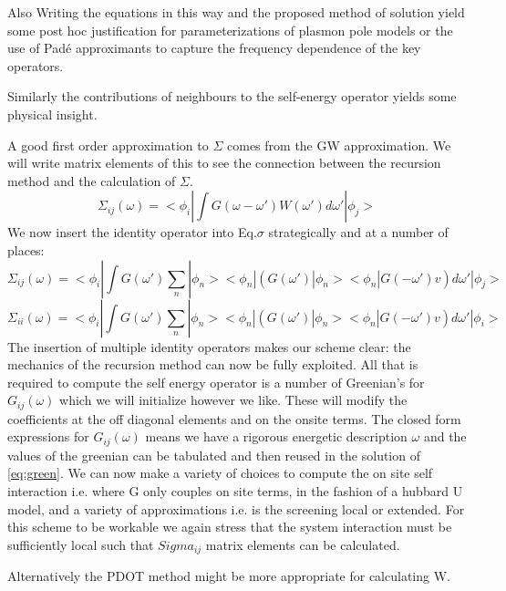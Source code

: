 \documentclass{article}
\begin{document}
Also Writing the equations in this way and the proposed method of solution
yield some post hoc justification for parameterizations of plasmon
pole models or the use of Pad\'e approximants to capture the frequency dependence
of the key operators.

Similarly the contributions of neighbours to the self-energy 
operator yields some physical insight.

A good first order approximation to $\Sigma$ comes from the GW approximation.
We will write matrix elements of this to see the connection between the
recursion method and the calculation of $\Sigma$. 
%
\begin{equation}
\label{eq:sigma}
\Sigma_{ij}(\omega) = <\phi_{i}|\int G(\omega-\omega')W(\omega')d\omega'|\phi_{j}>
\end{equation}
%
	We now insert the identity operator into Eq.$\sigma$ strategically and at 
a number of places:
%
\begin{equation}
\label{eq:sigma}
\Sigma_{ij}(\omega) = <\phi_{i}|\int G(\omega')\sum_{n}|\phi_{n}><\phi_{n}|(G(\omega')|\phi_{n}><\phi_{n}|G(-\omega')v)d\omega'|\phi_{j}>
\end{equation}
%
\begin{equation}
\label{eq:sigma_onsite}%
\Sigma_{ii}(\omega) = <\phi_{i}|\int G(\omega')\sum_{n}|\phi_{n}><\phi_{n}|(G(\omega')|\phi_{n}><\phi_{n}|G(-\omega')v)d\omega'|\phi_{i}>
\end{equation}
%
	The insertion of multiple identity operators
makes our scheme clear: the mechanics of the recursion method 
can now be fully exploited. All that is required to compute the self energy 
operator is a number of Greenian's for $G_{ij}(\omega)$ which we will
initialize however we like. These will modify the coefficients at the
off diagonal elements and on the onsite terms. The closed form
expressions for $G_{ij}(\omega)$ means we have a rigorous 
energetic description $\omega$ and the values of the greenian 
can be tabulated and then reused in the solution of \ref{eq:green}.
We can now make a variety of choices to compute the on site self interaction
i.e. where G only couples on site terms, in the fashion of a hubbard U model,
and a variety of approximations i.e. is the screening local or extended.
For this scheme to be workable we again stress that the system interaction
must be sufficiently local such that $Sigma_{ij}$ matrix elements can be
calculated.

Alternatively the PDOT method might be more appropriate for calculating W.
\end{document}
